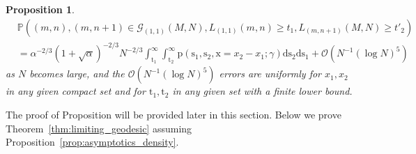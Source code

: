 \documentclass{article}
\newtheorem{prop}[thm]{Proposition}
\numberwithin{equation}{section}
\newcommand{\bigO}{\mathcal{O}}
\newcommand{\gd}{{\mathcal{G}}}
\newcommand{\limp}{\mathrm{p}}
\newcommand{\prob}{\mathbb{P}}
\begin{document}
\begin{prop}
\begin{equation}
	\begin{split}
		&\prob
		\left(
			(m,n), (m,n+1)\in \gd_{(1,1)}(M,N), L_{(1,1)}(m,n)\ge t_1,  L_{(m,n+1)}(M,N)\ge t'_2
		\right)\\
		&=\alpha^{-2/3}(1+\sqrt{\alpha})^{-2/3}N^{-2/3}\int_{\mathrm{t}_1}^\infty \int_{\mathrm{t}_2}^\infty\limp(\mathrm{s}_1,\mathrm{s}_2,\mathrm{x}=x_2-x_1;\gamma)\mathrm{d}{\mathrm{s}_2}\mathrm{d}{\mathrm{s}_1}+\bigO(N^{-1}(\log N)^5)
	\end{split}
\end{equation}
as $N$ becomes large, and the $\bigO(N^{-1}(\log N)^5)$ errors are uniformly for $x_1,x_2$ in any given compact set and for $\mathrm{t}_1,\mathrm{t}_2$ in any given set with a finite lower bound.	
\end{prop}





The proof of Proposition will be provided later in this section. 
Below we prove Theorem~\ref{thm:limiting_geodesic} assuming Proposition~\ref{prop:asymptotics_density}.
\end{document}
